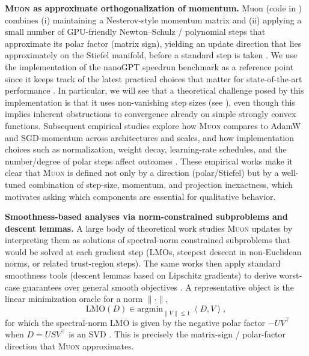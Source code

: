 \documentclass{article}
\theoremstyle{plain}
\theoremstyle{definition}
\theoremstyle{remark}
\newcommand{\Sv}{{S}} %
\newcommand{\Muon}{\textsc{Muon}}
\newcommand{\inner}[2]{\left\langle #1,#2 \right\rangle}
\begin{document}
\textbf{\Muon{} as approximate orthogonalization of momentum.} 
Muon 
(code in )
combines (i) maintaining a Nesterov-style momentum matrix and (ii) applying a small number of GPU-friendly Newton--Schulz / polynomial steps that approximate its polar factor (matrix sign), yielding an update direction that lies approximately on the Stiefel manifold, before a standard step is taken \cite{jordan2024muon}. 
We use the implementation of the nanoGPT speedrun benchmark as a reference point since it keeps track of the latest practical choices that matter for state-of-the-art performance \cite{nanogpt24speedrun}. 
In particular, we will see that a theoretical challenge posed by this implementation is that it uses non-vanishing step sizes (see ), even though this implies  inherent obstructions to convergence already on simple strongly convex functions. 
Subsequent empirical studies explore how \Muon{} compares to AdamW and SGD-momentum across architectures and scales, and how implementation choices such as normalization, weight decay, learning-rate schedules, and the number/degree of polar steps affect outcomes \cite{liu2025muonscalablellmtraining,shah2025practicalefficiencymuon}.
These empirical works make it clear that \Muon{} 
is defined not only by a direction (polar/Stiefel) 
but by a well-tuned combination of 
step-size, momentum, and projection inexactness, 
which motivates asking which components are essential for qualitative behavior.

\textbf{Smoothness-based analyses via norm-constrained subproblems and descent lemmas.}
A large body of theoretical work studies \Muon{} updates by interpreting them as solutions of spectral-norm constrained subproblems 
that would be solved at each gradient step
(LMOs, steepest descent in non-Euclidean norms, or related trust-region steps). The same works then apply standard smoothness tools (descent lemmas based on Lipschitz gradients) to derive worst-case guarantees over general smooth objectives 
\cite{pethick2025normconstrainedlmo,
li2025noteconvergencemuon,shen2025convergencemuon,
chen2025muonspectralnorm,kovalev2025understandinggo,
riabinin2025gluon,gruntkowska2025ef21muon,sato2025muonconvergence,nagashima2026improvedconvergenceratesmuon}. 
A representative object is the linear minimization oracle for a norm $\|\cdot\|$,
\[
\textrm{LMO}(D) \in \textrm{argmin}_{\|V\|\le 1}\ \inner{D}{V},
\]
for which the spectral-norm LMO is given by the negative polar factor $-UV^\top$ when $D=U\Sv V^\top$ is an SVD \cite{pethick2025normconstrainedlmo}.
This is precisely the matrix-sign / polar-factor direction that \Muon{} approximates.
\end{document}
